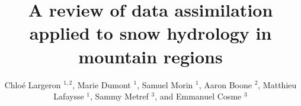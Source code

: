 \documentclass[utf8]{frontiersSCNS} %
\def\firstAuthorLast{Largeron {et~al.}} %
\def\Authors{Chloé Largeron $^{1,2}$, Marie Dumont $^{1}$, Samuel Morin $^{1}$, Aaron Boone $^{2}$, Matthieu Lafaysse $^{1}$, Sammy Metref $^{3}$, and Emmanuel Cosme $^{3}$}
\begin{document}
\onecolumn
{}

\title[A review of data assimilation applied to snow hydrology in mountain regions]{A review of data assimilation applied to snow hydrology in mountain regions} 

\author[\firstAuthorLast ]{\Authors} %
\address{} %
\correspondance{} %
\extraAuth{}%


\maketitle
\end{document}
